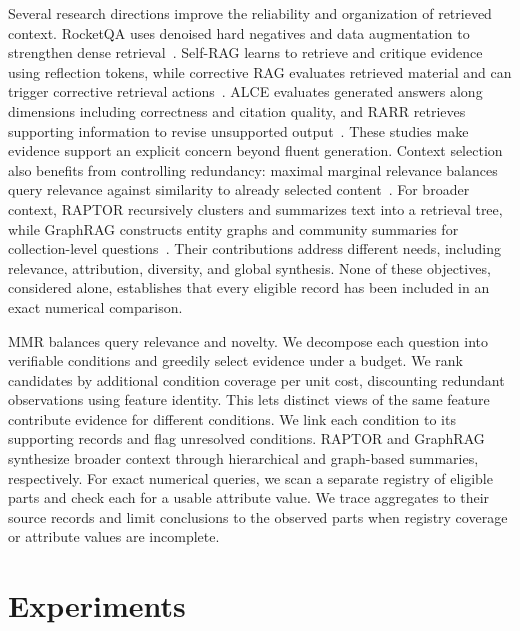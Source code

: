 \documentclass[preprint,12pt]{elsarticle}
\begin{document}
Several research directions improve the reliability and organization of retrieved context. RocketQA uses denoised hard negatives and data augmentation to strengthen dense retrieval~\cite{qu2020rocketqa}. Self-RAG learns to retrieve and critique evidence using reflection tokens, while corrective RAG evaluates retrieved material and can trigger corrective retrieval actions~\cite{asai2023selfrag,yan2024crag}. ALCE evaluates generated answers along dimensions including correctness and citation quality, and RARR retrieves supporting information to revise unsupported output~\cite{gao2023alce,gao2022rarr}. These studies make evidence support an explicit concern beyond fluent generation. Context selection also benefits from controlling redundancy: maximal marginal relevance balances query relevance against similarity to already selected content~\cite{carbonell1998mmr}. For broader context, RAPTOR recursively clusters and summarizes text into a retrieval tree, while GraphRAG constructs entity graphs and community summaries for collection-level questions~\cite{sarthi2024raptor,edge2024graphrag}. Their contributions address different needs, including relevance, attribution, diversity, and global synthesis. None of these objectives, considered alone, establishes that every eligible record has been included in an exact numerical comparison.

MMR balances query relevance and novelty. We decompose each question into verifiable conditions and greedily select evidence under a budget. We rank candidates by additional condition coverage per unit cost, discounting redundant observations using feature identity. This lets distinct views of the same feature contribute evidence for different conditions. We link each condition to its supporting records and flag unresolved conditions. RAPTOR and GraphRAG synthesize broader context through hierarchical and graph-based summaries, respectively. For exact numerical queries, we scan a separate registry of eligible parts and check each for a usable attribute value. We trace aggregates to their source records and limit conclusions to the observed parts when registry coverage or attribute values are incomplete.



\clearpage
\section{Experiments}
\label{sec:experiments}
\end{document}
